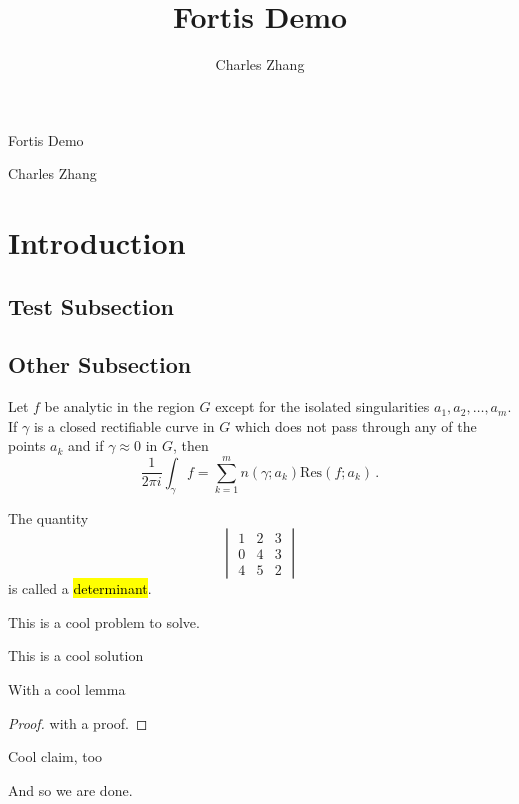 \documentclass{article}
\title{Fortis Demo}
\author{Charles Zhang}
\begin{document}
\nrl\nrl
\begin{center}
    \huge{Fortis Demo}
    
    \large{Charles Zhang}
\end{center}\nrl
\tableofcontents
\newpage
\section{Introduction}
\subsection{Test Subsection}
\lipsum[1-1]
\subsection{Other Subsection}
\begin{thm}
    Let $f$ be analytic in the region $G$ except for the isolated 
    singularities $a_1,a_2,\dots,a_m$. If $\gamma$ is a closed 
    rectifiable curve in $G$ which does not pass through any of the 
    points $a_k$ and if $\gamma\approx 0$ in $G$, then
    \[
      \frac{1}{2\pi i}\int_\gamma\! f = \sum_{k=1}^m 
      n(\gamma;a_k)\text{Res}(f;a_k)\,.
    \]
\end{thm}
\lipsum[2-2]
\begin{definition}
    The quantity 
    \[
        \begin{vmatrix}
            1 & 2 & 3 \\
            0 & 4 & 3 \\
            4 & 5 & 2
        \end{vmatrix}
    \]
    is called a \hl{determinant}.
\end{definition}
\lipsum[3-3]
\begin{problem}
    This is a cool problem to solve.
\end{problem}
\begin{solution}
    This is a cool solution
    \begin{lemma}
        With a cool lemma
    \end{lemma}
    \begin{proof}
        with a proof. \lipsum[69-69]
    \end{proof}
    
    \lipsum[71-71]
    \begin{claim}
        Cool claim, too
    \end{claim}
    And so we are done.
\end{solution}
\end{document}
